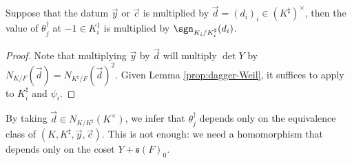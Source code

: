 \documentclass[a4paper,10pt]{article}
\begin{document}
\begin{lemma}\label{prop:dagger-variance}
	Suppose that the datum $\vec{y}$ or $\vec{c}$ is multiplied by $\vec{d} = (d_i)_i \in (K^\sharp)^\times$, then the value of $\theta_j^\dagger$ at $-1 \in K_i^1$ is multiplied by $\sgn_{K_i/K_i^\sharp}(d_i)$.
\end{lemma}
\begin{proof}
	Note that multiplying $\vec{y}$ by $\vec{d}$ will multiply $\det Y$ by $N_{K/F}(\vec{d}) = N_{K^\sharp/F}(\vec{d})^2$. Given Lemma \ref{prop:dagger-Weil}, it suffices to apply \cite[Lemma 4.13]{Li11} to $K_i^\sharp$ and $\psi_i$.
\end{proof}
By taking $\vec{d} \in N_{K/K^\sharp}(K^\times)$, we infer that $\theta_j^\dagger$ depends only on the equivalence class of $(K, K^\sharp, \vec{y}, \vec{c})$. This is not enough: we need a homomorphism that depends only on the coset $Y + \mathfrak{s}(F)_0$.
\end{document}
